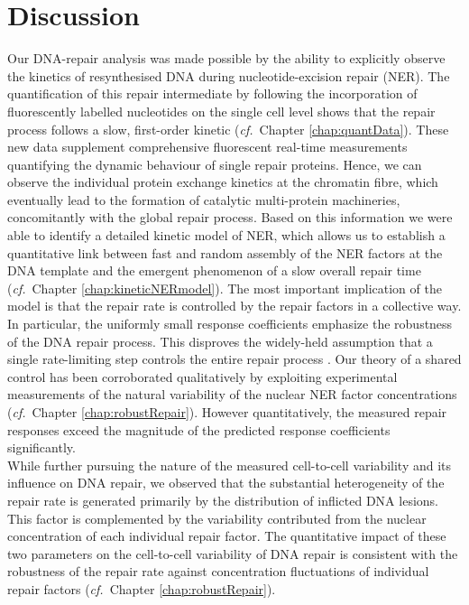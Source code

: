 \chapter{Discussion}


Our DNA-repair analysis was made possible by the ability to explicitly observe the kinetics of resynthesised DNA during nucleotide-excision repair (NER). The quantification of this repair intermediate by following the incorporation of fluorescently labelled nucleotides on the single cell level shows that the repair process follows a slow, first-order kinetic (\textit{cf.}\ Chapter \ref{chap:quantData}). These new data supplement comprehensive fluorescent real-time measurements quantifying the dynamic behaviour of single repair proteins. Hence, we can observe the individual protein exchange kinetics at the chromatin fibre, which eventually lead to the formation of catalytic multi-protein machineries, concomitantly with the global repair process. Based on this information we were able to identify a detailed kinetic model of NER, which allows us to establish a quantitative link between fast and random assembly of the NER factors at the DNA template and the emergent phenomenon of a slow overall repair time (\textit{cf.}\ Chapter \ref{chap:kineticNERmodel}). The most important implication of the model is that the repair rate is controlled by the repair factors in a collective way. In particular, the uniformly small response coefficients emphasize the robustness of the DNA repair process. This disproves the widely-held assumption that a single rate-limiting step controls the entire repair process \cite{Hoogstraten2008,Koberle2006,Kang2011}. Our theory of a shared control has been corroborated qualitatively by exploiting experimental measurements of the natural variability of the nuclear NER factor concentrations (\textit{cf.}\ Chapter \ref{chap:robustRepair}). However quantitatively, the measured repair responses exceed the magnitude of the predicted response coefficients significantly.\\
While further pursuing the nature of the measured cell-to-cell variability and its influence on DNA repair, we observed that the substantial heterogeneity of the repair rate is generated primarily by the distribution of inflicted DNA lesions. This factor is complemented by the variability contributed from the nuclear concentration of each individual repair factor. The quantitative impact of these two parameters on the cell-to-cell variability of DNA repair is consistent with the robustness of the repair rate against concentration fluctuations of individual repair factors (\textit{cf.}\ Chapter \ref{chap:robustRepair}).\\  

